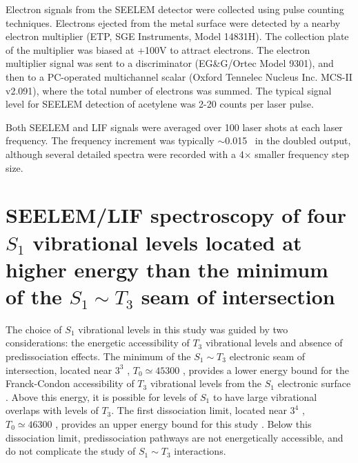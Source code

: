 Electron signals from the SEELEM detector were collected using pulse
counting techniques.  Electrons ejected from the metal surface were
detected by a nearby electron multiplier (ETP, SGE Instruments, Model
14831H).  The collection plate of the multiplier was biased at +100V
to attract electrons.  The electron multiplier signal was sent to a
discriminator (EG\&G/Ortec Model 9301), and then to a PC-operated
multichannel scalar (Oxford Tennelec Nucleus Inc. MCS-II v2.091),
where the total number of electrons was summed.  The typical signal
level for SEELEM detection of acetylene was 2-20 counts per laser
pulse.

Both SEELEM and LIF signals were averaged over 100 laser shots at each
laser frequency.  The frequency increment was typically $\sim$0.015
\rcm\ in the doubled output, although several detailed spectra were
recorded with a 4$\times$ smaller frequency step size.





























\section{SEELEM/LIF spectroscopy of four $S_1$ vibrational levels
  located at higher energy than the minimum of the $S_1 \sim T_3$ seam
  of intersection}


The choice of $S_1$ vibrational levels in this study was guided by two
considerations: the energetic accessibility of $T_3$ vibrational
levels \cite{cui97, thom07} and absence of predissociation effects.
The minimum of the $S_1 \sim T_3$ electronic seam of intersection,
located near $3^3$ , $T_0 \simeq 45300$ \rcm, provides a lower
energy bound for the Franck-Condon accessibility of $T_3$ vibrational
levels from the $S_1$ electronic surface \cite{cui97}.  Above this
energy, it is possible for levels of $S_1$ to have large vibrational
overlaps with levels of $T_3$.  The first dissociation limit, located
near $3^4$ , $T_0 \simeq 46300$ \rcm, provides an upper energy
bound for this study \cite{mordaunt98}.  Below this dissociation
limit, predissociation pathways are not energetically accessible, and
do not complicate the study of $S_1 \sim T_3$ interactions.

